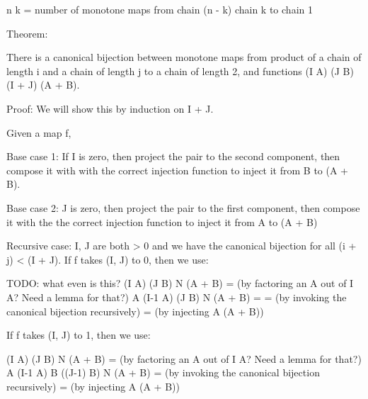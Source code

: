 \documentclass{proc-l}
\theoremstyle{definition}
\theoremstyle{remark}
\numberwithin{equation}{section}
\begin{document}
{n \choose k} = number of monotone maps from chain (n - k) \times chain k to chain 1

Theorem:

There is a canonical bijection between monotone maps from product of a chain of length i and a chain of length j to a chain of length 2, and functions (I \to A) \times (J \to B) \to (I + J) \to (A + B).

Proof:
We will show this by induction on I + J.

Given a map f,

Base case 1: If I is zero, then project the pair to the second component, then compose it with with the correct injection function to inject it from B to (A + B).

Base case 2: J is zero, then project the pair to the first component, then compose it with the the correct injection function to inject it from A to (A + B)

Recursive case: I, J are both > 0 and we have the canonical bijection for all (i + j) < (I + J).
If f takes (I, J) to 0, then 
we use:

TODO: what even is this?
(I \to A) \times (J \to B) \to N \to (A + B)
= (by factoring an A out of I \to A? Need a lemma for that?)
A \times (I-1 \to A) \times (J \to B) \to N \to (A + B)
= 
= (by invoking the canonical bijection recursively)
= (by injecting A \to (A + B))

If f takes (I, J) to 1, then
we use:

(I \to A) \times (J \to B) \to N \to (A + B)
= (by factoring an A out of I \to A? Need a lemma for that?)
A \times (I-1 \to A) \times B \times ((J-1) \to B) \to N \to (A + B)
= (by invoking the canonical bijection recursively)
= (by injecting A \to (A + B))


\end{document}
